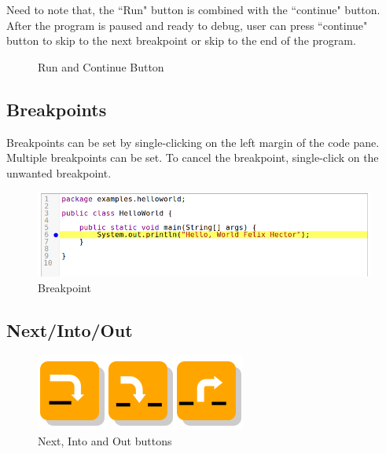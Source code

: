 \documentclass[11pt, a4paper]{article}
\begin{document}
Need to note that, the ``Run" button is combined with the ``continue" button.
After the program is paused and ready to debug, user can press ``continue" button to skip to the next breakpoint or skip to the end of the program.
\begin{figure}[h!]
\centering
{}
\quad
{}
\caption{Run and Continue Button}
\end{figure}
\subsection{Breakpoints}
Breakpoints can be set by single-clicking on the left margin of the code pane.
Multiple breakpoints can be set.
To cancel the breakpoint, single-click on the unwanted breakpoint.
\begin{figure}[h!]
\centering
\includegraphics[width=\textwidth]{breakpoint.png}
\caption{Breakpoint}
\label{fig:breakpoint}
\end{figure}
\subsection{Next/Into/Out}
\begin{figure}[h!]
\centering
\includegraphics[scale=0.6]{buttons.png}
\caption{Next, Into and Out buttons}
\label{fig:buttons}
\end{figure}
\end{document}

